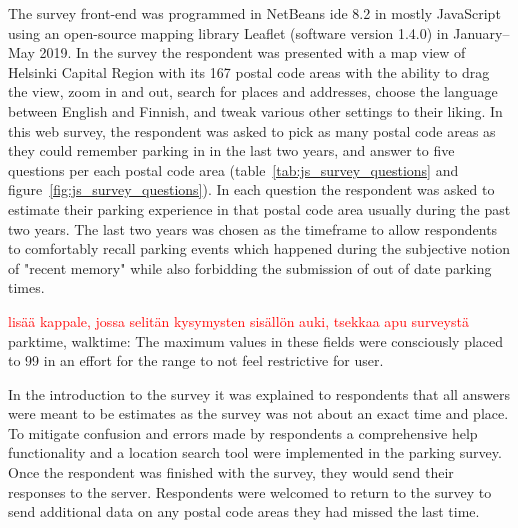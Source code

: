 The survey front-end was programmed in NetBeans \gls{ide} 8.2 in mostly JavaScript using an open-source mapping library Leaflet (software version 1.4.0) in January--May 2019. In the survey the respondent was presented with a map view of Helsinki Capital Region with its 167 postal code areas with the ability to drag the view, zoom in and out, search for places and addresses, choose the language between English and Finnish, and tweak various other settings to their liking. In this web survey, the respondent was asked to pick as many postal code areas as they could remember parking in in the last two years, and answer to five questions per each postal code area (table~\ref{tab:js_survey_questions} and figure~\ref{fig:js_survey_questions}). In each question the respondent was asked to estimate their parking experience in that postal code area usually during the past two years. The last two years was chosen as the timeframe to allow respondents to comfortably recall parking events which happened during the subjective notion of "recent memory" while also forbidding the submission of out of date parking times. 

\textcolor{red}{lisää kappale, jossa selitän kysymysten sisällön auki, tsekkaa apu surveystä} parktime, walktime: The maximum values in these fields were consciously placed to 99 in an effort for the range to not feel restrictive for user.

In the introduction to the survey it was explained to respondents that all answers were meant to be estimates as the survey was not about an exact time and place. To mitigate confusion and errors made by respondents a comprehensive help functionality and a location search tool were implemented in the parking survey. Once the respondent was finished with the survey, they would send their responses to the server. Respondents were welcomed to return to the survey to send additional data on any postal code areas they had missed the last time.

